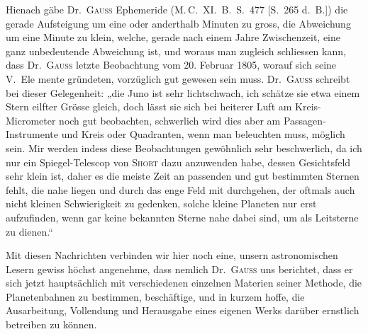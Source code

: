 \par\indent Hienach gäbe Dr.\ \textsc{Gauss} Ephemeride (M.\,C.\ XI.\ B.\ S.\ 477 [S.\ 265 d.\ B.]) die gerade Aufsteigung um eine oder anderthalb Minuten zu gross, die Abweichung um eine Minute zu klein, welche, gerade nach einem Jahre Zwischenzeit, eine ganz unbedeutende Abweichung ist, und woraus man zugleich schliessen kann, dass Dr.\ \textsc{Gauss} letzte Beobachtung vom 20. Februar 1805, worauf sich seine V.\ Ele%
%
mente gründeten, vorzüglich gut gewesen sein muss. Dr.~\textsc{Gauss} schreibt bei dieser Gelegenheit: „die Juno ist sehr lichtschwach, ich schätze sie etwa einem Stern eilfter Grösse gleich, doch lässt sie sich bei heiterer Luft am Kreis-Micrometer noch gut beobachten, schwerlich wird dies aber am Passagen-Instrumente und Kreis oder Quadranten, wenn man beleuchten muss, möglich sein. Mir werden indess diese Beobachtungen gewöhnlich sehr beschwerlich, da ich nur ein Spiegel-Telescop von \textsc{Short} dazu anzuwenden habe, dessen Gesichtsfeld sehr klein ist, daher es die meiste Zeit an passenden und gut bestimmten Sternen fehlt, die nahe liegen und durch das enge Feld mit durchgehen, der oftmals auch nicht kleinen Schwierigkeit zu gedenken, solche kleine Planeten nur erst aufzufinden, wenn gar keine bekannten Sterne nahe dabei sind, um als Leitsterne zu dienen.“

\par\indent Mit diesen Nachrichten verbinden wir hier noch eine, unsern astronomischen Lesern gewiss höchst angenehme, dass nemlich Dr.~\textsc{Gauss} uns berichtet, dass er sich jetzt hauptsächlich mit verschiedenen einzelnen Materien seiner Methode, die Planetenbahnen zu bestimmen, beschäftige, und in kurzem hoffe, die Ausarbeitung, Vollendung und Herausgabe eines eigenen Werks darüber ernstlich betreiben zu können.

\begin{flushright}
\end{flushright}
